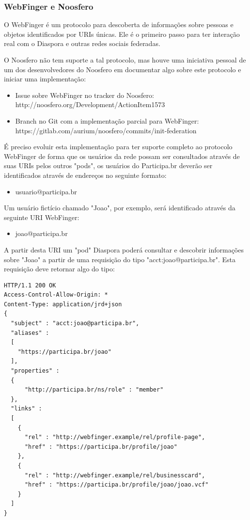 \documentclass[12pt]{article}
\begin{document}
\subsubsection{WebFinger e Noosfero}

O WebFinger é um protocolo para descoberta de informações sobre pessoas e
objetos identificados por URIs únicas. Ele é o primeiro passo para ter
interação real com o Diaspora e outras redes sociais federadas.

O Noosfero não tem suporte a tal protocolo, mas houve uma iniciativa pessoal
de um dos desenvolvedores do Noosfero em documentar algo sobre este protocolo
e iniciar uma implementação:

\begin{itemize}
  \item Issue sobre WebFinger no tracker do Noosfero: \\
    http://noosfero.org/Development/ActionItem1573
  \item Branch no Git com a implementação parcial para WebFinger: \\
    https://gitlab.com/aurium/noosfero/commits/init-federation
\end{itemize}

É preciso evoluir esta implementação para ter suporte completo ao protocolo
WebFinger de forma que os usuários da rede possam ser consultados através de
suas URIs pelos outros "pods", os usuários do Participa.br deverão ser
identificados através de endereços no seguinte formato:

\begin{itemize}
  \item usuario@participa.br
\end{itemize}

Um usuário fictício chamado "Joao", por exemplo, será identificado através da
seguinte URI WebFinger:

\begin{itemize}
  \item joao@participa.br
\end{itemize}

A partir desta URI um "pod" Diaspora poderá consultar e descobrir informações
sobre "Joao" a partir de uma requisição do tipo "acct:joao@participa.br". Esta
requisição deve retornar algo do tipo:


\begin{framed}
\begin{lstlisting}[caption=Exemplo resposta a consulta WebFinger]
HTTP/1.1 200 OK
Access-Control-Allow-Origin: *
Content-Type: application/jrd+json
{
  "subject" : "acct:joao@participa.br",
  "aliases" :
  [
    "https://participa.br/joao"
  ],
  "properties" :
  {
      "http://participa.br/ns/role" : "member"
  },
  "links" :
  [
    {
      "rel" : "http://webfinger.example/rel/profile-page",
      "href" : "https://participa.br/profile/joao"
    },
    {
      "rel" : "http://webfinger.example/rel/businesscard",
      "href" : "https://participa.br/profile/joao/joao.vcf"
    }
  ]
}
\end{lstlisting}
\end{framed}
\end{document}
